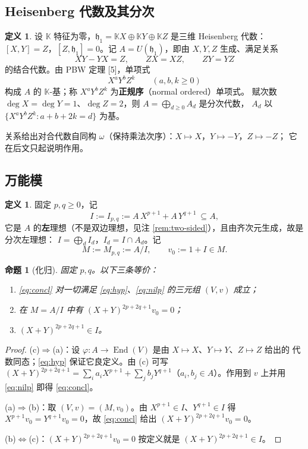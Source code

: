 \documentclass[11pt,UTF8]{ctexart}
\newtheorem{proposition}[theorem]{命题}
\theoremstyle{definition}
\newtheorem{definition}[theorem]{定义}
\newcommand{\End}{\operatorname{End}}
\newcommand{\K}{\mathbb{K}}
\newcommand{\hh}{\mathfrak{h}}
\begin{document}
\subsection{Heisenberg 代数及其分次}

\begin{definition}\label{def:A}
设 $\K$ 特征为零，$\hh_1=\K X\oplus\K Y\oplus\K Z$ 是三维 Heisenberg 代数：
$[X,Y]=Z$，$[Z,\hh_1]=0$。记 $A=U(\hh_1)$，即由 $X,Y,Z$ 生成、满足关系
\[
XY-YX=Z,\qquad ZX=XZ,\qquad ZY=YZ
\]
的结合代数。由 PBW 定理 [5]，单项式
\[
X^{a}Y^{b}Z^{k}\qquad(a,b,k\ge 0)
\]
构成 $A$ 的 $\K$-基；称 $X^aY^bZ^k$ 为\textbf{正规序}（normal ordered）单项式。
赋次数 $\deg X=\deg Y=1$、$\deg Z=2$，则 $A=\bigoplus_{d\ge0}A_d$ 是分次代数，
$A_d$ 以 $\{X^aY^bZ^k: a+b+2k=d\}$ 为基。
\end{definition}

关系给出对合代数自同构 $\omega$（保持乘法次序）：$X\mapsto X$，$Y\mapsto -Y$，$Z\mapsto -Z$；
它在后文只起说明作用。

\subsection{万能模}

\begin{definition}\label{def:I}
固定 $p,q\ge0$，记
\[
I:=I_{p,q}:=A\,X^{p+1}+A\,Y^{q+1}\ \subseteq A ,
\]
它是 $A$ 的\textbf{左}理想（不是双边理想，见注 \ref{rem:two-sided}），且由齐次元生成，故是分次左理想：
$I=\bigoplus_d I_d$，$I_d=I\cap A_d$。记
\[
M:=M_{p,q}:=A/I,\qquad v_0:=1+I\in M .
\]
\end{definition}

\begin{proposition}[化归]\label{prop:reduce}
固定 $p,q$。以下三条等价：
\begin{enumerate}[label=(\alph*)]
\item \eqref{eq:concl} 对一切满足 \eqref{eq:hyp}、\eqref{eq:nilp} 的三元组 $(V,v)$ 成立；
\item 在 $M=A/I$ 中有 $(X+Y)^{2p+2q+1}v_0=0$；
\item $(X+Y)^{2p+2q+1}\in I$。
\end{enumerate}
\end{proposition}

\begin{proof}
(c)$\Rightarrow$(a)：设 $\varphi:A\to\End(V)$ 是由 $X\mapsto X$、$Y\mapsto Y$、$Z\mapsto Z$ 给出的
代数同态；\eqref{eq:hyp} 保证它良定义。由 (c) 可写
$(X+Y)^{2p+2q+1}=\sum_i a_iX^{p+1}+\sum_j b_jY^{q+1}$（$a_i,b_j\in A$）。作用到 $v$ 上并用
\eqref{eq:nilp} 即得 \eqref{eq:concl}。

(a)$\Rightarrow$(b)：取 $(V,v)=(M,v_0)$。由 $X^{p+1}\in I$、$Y^{q+1}\in I$ 得
$X^{p+1}v_0=Y^{q+1}v_0=0$，故 \eqref{eq:concl} 给出 $(X+Y)^{2p+2q+1}v_0=0$。

(b)$\Leftrightarrow$(c)：$(X+Y)^{2p+2q+1}v_0=0$ 按定义就是 $(X+Y)^{2p+2q+1}\in I$。
\end{proof}
\end{document}
